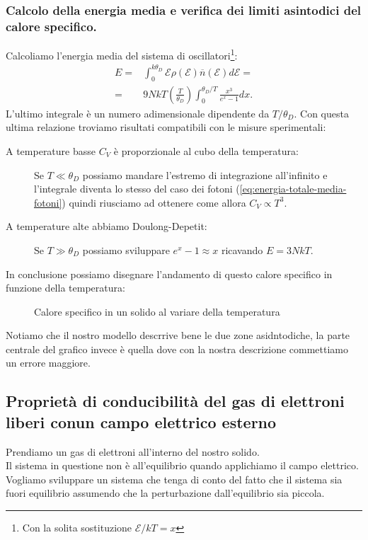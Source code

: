 \subsubsection{Calcolo della energia media e verifica dei limiti asintodici del calore specifico.}
\label{subsubsec:Calcolo della energia media e verifica dei limiti asintodici del calore specifico.}
Calcoliamo l'energia media del sistema di oscillatori\footnote{Con la solita sostituzione $\mathcal{E} /kT = x$}:
\[\begin{aligned}
	E 
	=&
	\int_{0}^{k\theta _D} 
	\mathcal{E} \rho (\mathcal{E} ) 
	\overline{n}( \mathcal{E} ) 
	d\mathcal{E} = \\
	=& 
	9NkT 
	\left( \frac{T}{\theta _D} \right)
	\int_{0}^{\theta _D /T} 
	\frac{x^3}{e^x-1}
	dx
.\end{aligned}\]
L'ultimo integrale è un numero adimensionale dipendente da $T /\theta _D$. Con questa ultima relazione troviamo risultati compatibili con le misure sperimentali:
\begin{description}
	\item[A temperature basse $C_V$ è proporzionale al cubo della temperatura:]
		Se $T \ll \theta _D$ possiamo mandare l'estremo di integrazione
		all'infinito e l'integrale diventa lo stesso del caso dei fotoni 
		(\ref{eq:energia-totale-media-fotoni}) quindi riusciamo ad ottenere
		come allora $C_V \propto T^3$. 
	\item[A temperature alte abbiamo Doulong-Depetit:] 
		Se $T \gg \theta _D$ possiamo sviluppare $e^x-1 \approx x$ 
		ricavando $E = 3NkT$.
\end{description}
In conclusione possiamo disegnare l'andamento di questo calore specifico in funzione della temperatura:
\begin{figure}[H]
    \centering
    \caption{Calore specifico in un solido al variare della temperatura}
    \label{fig:calore-specifico-in-un-solido-al-variare-della-temperatura}
\end{figure}
\noindent
Notiamo che il nostro modello descrrive bene le due zone asidntodiche, la parte centrale del grafico invece è quella dove con la nostra descrizione commettiamo un errore maggiore.
\subsection{Proprietà di conducibilità del gas di elettroni liberi conun campo elettrico esterno}
\label{subsec:Proprietà di conducibilità del gas di elettroni liberi conun campo elettrico esterno}
Prendiamo un gas di elettroni all'interno del nostro solido.\\
Il sistema in questione non è all'equilibrio quando applichiamo il campo elettrico. Vogliamo sviluppare un sistema che tenga di conto del fatto che il sistema sia fuori equilibrio assumendo che la perturbazione dall'equilibrio sia piccola.
